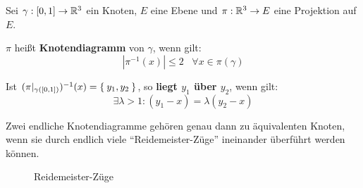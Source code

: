 \begin{definition}%
    Sei $\gamma: [0,1] \rightarrow \mathbb{R}^3$ ein Knoten, $E$ eine Ebene und 
    $\pi: \mathbb{R}^3 \rightarrow E$ eine Projektion auf $E$.

    $\pi$ heißt \textbf{Knotendiagramm} von $\gamma$, wenn gilt:
    \[\left | \pi^{-1}(x) \right | \leq 2 \;\;\; \forall x \in \pi(\gamma)\]

    Ist $(\pi|_{\gamma([0,1])})^{-1}(x) = \Set{y_1, y_2}$, so \textbf{liegt $y_1$ über $y_2$},
    wenn gilt:
    \[\exists \lambda > 1: (y_1-x) = \lambda (y_2 - x)\]
\end{definition}

\begin{satz}
    Zwei endliche Knotendiagramme gehören genau dann zu äquivalenten
    Knoten, wenn sie durch endlich viele \enquote{Reidemeister-Züge}
    ineinander überführt werden können.
\end{satz}

\begin{figure}[htp]
    \centering
    \qquad\qquad%


    \caption{Reidemeister-Züge}
    \label{fig:reidemeister-zuege}
\end{figure}

